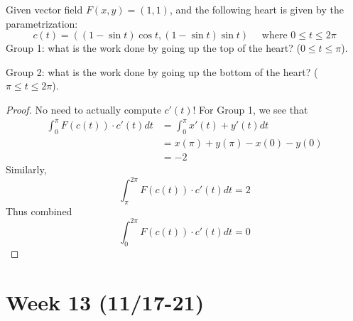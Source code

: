 \documentclass[openany]{book}
\begin{document}
\begin{prob}
    Given vector field $F(x,y)=(1,1)$, and the following heart is given by the parametrization:
    \begin{equation*}
        c(t)=((1-\sin t)\cos t, (1-\sin t)\sin t) \quad \text{ where } 0\leq t\leq 2\pi
    \end{equation*}
    Group 1: what is the work done by going up the top of the heart? ($0\leq t\leq \pi$).
    
    \noindent
    Group 2: what is the work done by going up the bottom of the heart? ($\pi\leq t\leq 2\pi$).
    \begin{center}
    \end{center}
\end{prob}
\begin{proof}
    No need to actually compute $c'(t)$! For Group 1, we see that 
    \begin{align*}
        \int_0^\pi F(c(t))\cdot c'(t)dt&=\int_0^\pi x'(t)+y'(t)dt \tag{$c(t)=(x(t),y(t))$}\\
        &=x(\pi)+y(\pi)-x(0)-y(0)\\
        &=-2
    \end{align*}
    Similarly, 
    \begin{equation*}
        \int_{\pi}^{2\pi}F(c(t))\cdot c'(t)dt=2
    \end{equation*}
    Thus combined 
    \begin{equation*}
        \int_0^{2\pi}F(c(t))\cdot c'(t)dt=0
    \end{equation*}
\end{proof}



\newpage 
\section*{\centering Week 13 (11/17-21)}
\end{document}
